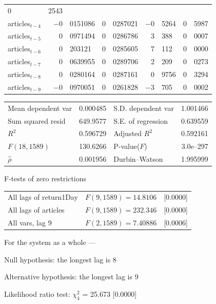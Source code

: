 \begin{center}
\begin{longtable}{lr@{.}lr@{.}lr@{.}lr@{.}l}
        0&2543 \\
articles$_{t-4}$ &
    $-$0&0151086 &
    0&0287021 &
        $-$0&5264 &
        0&5987 \\
articles$_{t-5}$ &
    0&0971494 &
    0&0286786 &
        3&388 &
        0&0007 \\
articles$_{t-6}$ &
    0&203121 &
    0&0285605 &
        7&112 &
        0&0000 \\
articles$_{t-7}$ &
    0&0639955 &
    0&0289706 &
        2&209 &
        0&0273 \\
articles$_{t-8}$ &
    0&0280164 &
    0&0287161 &
        0&9756 &
        0&3294 \\
articles$_{t-9}$ &
    $-$0&0970051 &
    0&0261828 &
        $-$3&705 &
        0&0002 \\
\end{longtable}

\begin{tabular}{lrlr}
Mean dependent var &  0.000485 & S.D. dependent var &  1.001466 \\
Sum squared resid &  649.9577 & S.E. of regression &  0.639559 \\
$R^2$ &  0.596729 & Adjusted $R^2$ &  0.592161 \\
$F(18, 1589)$ &  130.6266 & P-value($F$) &  3.0\textrm{e--297} \\
$\hat{\rho}$ &  0.001956 & Durbin--Watson &  1.995999 \\
\end{tabular}

\end{center}

\begin{center}
F-tests of zero restrictions\\[1em]
\begin{tabular}{lll}
All lags of return1Day & $F(9, 1589) = 14.8106$ & [0.0000]\\
All lags of articles & $F(9, 1589) = 232.346$ & [0.0000]\\
All vars, lag 9 & $F(2, 1589) = 7.40886$ & [0.0006]\\
\end{tabular}
\end{center}

\noindent For the system as a whole ---\par
Null hypothesis: the longest lag is 8\par
Alternative hypothesis: the longest lag is 9\par
Likelihood ratio test: $\chi^2_{4}$ = 25.673 [0.0000]\par    

